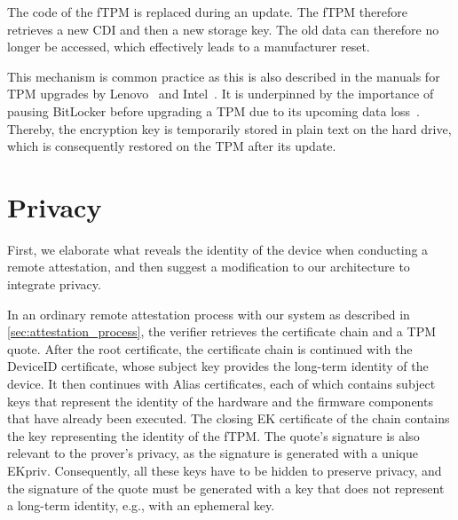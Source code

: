 The code of the fTPM is replaced during an update.
The fTPM therefore retrieves a new CDI and then a new storage key.
The old data can therefore no longer be accessed, which effectively leads to a manufacturer reset.

This mechanism is common practice as this is also described in the manuals for TPM upgrades by Lenovo~\cite{LenovoTpmUpgrade} and Intel~\cite{intelTpmUpgrade}. 
It is underpinned by the importance of pausing BitLocker before upgrading a TPM due to its upcoming data loss~\cite{BitlockerTpmUpgrade}.
Thereby, the encryption key is temporarily stored in plain text on the hard drive, which is consequently restored on the TPM after its update.





\section{Privacy}\label{sec:privacy}

First, we elaborate what reveals the identity of the device when conducting a remote attestation, and then suggest a modification to our architecture to integrate privacy.

In an ordinary remote attestation process with our system as described in \autoref{sec:attestation_process}, the verifier retrieves the certificate chain and a TPM quote.
After the root certificate, the certificate chain is continued with the DeviceID certificate, whose subject key provides the long-term identity of the device.
It then continues with Alias certificates, each of which contains subject keys that represent the identity of the hardware and the firmware components that have already been executed.
The closing EK certificate of the chain contains the key representing the identity of the fTPM\@.
The quote's signature is also relevant to the prover's privacy, as the signature is generated with a unique EKpriv.
Consequently, all these keys have to be hidden to preserve privacy, and the signature of the quote must be generated with a key that does not represent a long-term identity, e.g., with an ephemeral key.

